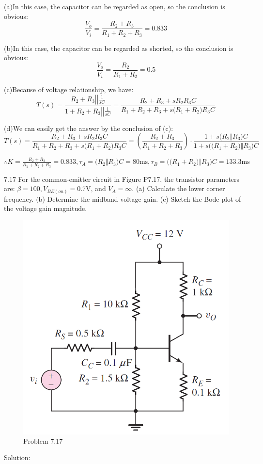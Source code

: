 \documentclass[a4paper,11pt,UTF8]{article}
\begin{document}
(a)In this case, the capacitor can be regarded as open, so the conclusion is obvious:
$$
	\frac{V_o}{V_i}=\frac{R_2+R_3}{R_1+R_2+R_3}=0.833
$$

(b)In this case, the capacitor can be regarded as shorted, so the conclusion is obvious:
$$
\frac{V_o}{V_i}=\frac{R_2}{R_1+R_2}=0.5
$$

(c)Because of voltage relationship, we have:
$$
	T(s)=\frac{R_2+R_3\left|\left|\displaystyle\frac1{sC}\right.\right.}{1+R_2+R_3\left|\left|\displaystyle\frac1{sC}\right.\right.}=\frac{R_{2}+R_{3}+sR_{2}R_{3}C}{R_{1}+R_{2}+R_{3}+s\bigl(R_{1}+R_{2}\bigr)R_{3}C}
$$

(d)We can easily get the answer by the conclusion of (c):
$$
	T(s)=\frac{R_{2}+R_{3}+sR_{2}R_{3}C}{R_{1}+R_{2}+R_{3}+s\bigl(R_{1}+R_{2}\bigr)R_{3}C}=\left(\frac{R_2+R_3}{R_1+R_2+R_3}\right)\cdot\frac{1+s\Big(R_2\Big\Vert R_3\Big)C}{1+s\Big(\Big(R_1+R_2\Big)\Big\Vert R_3\Big)C}
$$

$\therefore\displaystyle K=\frac{R_2+R_3}{R_1+R_2+R_3}=0.833, \tau_A=\Big(R_2\Big\Vert R_3\Big)C=80\mathrm{ms},\tau_B=\Big(\Big(R_1+R_2\Big)\Big\Vert R_3\Big)C=133.3\mathrm{ms}$

7.17 For the common-emitter circuit in Figure P7.17, the transistor parameters are: $\beta = 100, V_{BE(on)} = 0.7 $V, and $V_A =\infty$. (a) Calculate the lower corner frequency. (b) Determine the midband voltage gain. (c) Sketch the Bode plot of the voltage gain magnitude.
\begin{figure}[H]
	\centering
	\includegraphics[scale=0.3]{MD7.17}
	\caption{Problem 7.17}
\end{figure}
Solution:
\end{document}
